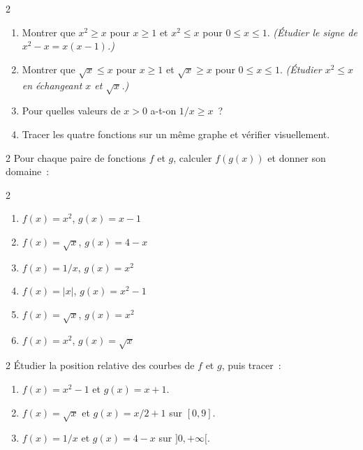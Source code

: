\begin{exo}{2}
\begin{enumerate}
  \item Montrer que $x^2\geq x$ pour $x\geq1$ et $x^2\leq x$ pour $0\leq x\leq1$.
        \emph{(\'Etudier le signe de $x^2-x=x(x-1)$.)}
  \item Montrer que $\sqrt{x}\leq x$ pour $x\geq1$ et $\sqrt{x}\geq x$ pour $0\leq x\leq1$.
        \emph{(\'Etudier $x^2\leq x$ en \'echangeant $x$ et $\sqrt{x}$.)}
  \item Pour quelles valeurs de $x>0$ a-t-on $1/x\geq x$~?
  \item Tracer les quatre fonctions sur un m\^eme graphe et v\'erifier visuellement.
\end{enumerate}
\end{exo}

\begin{exo}{2}
Pour chaque paire de fonctions $f$ et $g$, calculer $f(g(x))$ et donner son domaine~:
\begin{multicols}{2}
\begin{enumerate}
  \item $f(x)=x^2$, $g(x)=x-1$
  \item $f(x)=\sqrt{x}$, $g(x)=4-x$
  \item $f(x)=1/x$, $g(x)=x^2$
  \item $f(x)=|x|$, $g(x)=x^2-1$
  \item $f(x)=\sqrt{x}$, $g(x)=x^2$
  \item $f(x)=x^2$, $g(x)=\sqrt{x}$
\end{enumerate}
\end{multicols}
\end{exo}

\begin{exo}{2}
\'Etudier la position relative des courbes de $f$ et $g$, puis tracer~:
\begin{enumerate}
  \item $f(x)=x^2-1$ et $g(x)=x+1$.
  \item $f(x)=\sqrt{x}$ et $g(x)=x/2+1$ sur $[0,9]$.
  \item $f(x)=1/x$ et $g(x)=4-x$ sur $]0,+\infty[$.
\end{enumerate}
\end{exo}

